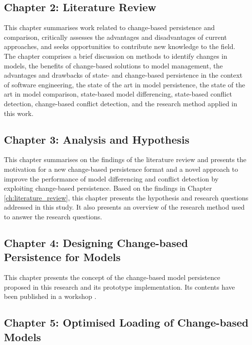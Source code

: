 \subsection{Chapter 2: Literature Review}
\label{sec:chapter_2_literature_review_plan}
This chapter summarises work related to change-based persistence and comparison, critically assesses the advantages and disadvantages of current approaches, and seeks opportunities to contribute new knowledge to the field. The chapter comprises a brief discussion on methods to identify changes in models, the benefits of change-based solutions to model management, the advantages and drawbacks of state- and change-based persistence in the context of software engineering, the state of the art in model persistence, the state of the art in model comparison, state-based model differencing, state-based conflict detection, change-based conflict detection, and the research method applied in this work.

\subsection{Chapter 3: Analysis and Hypothesis}
\label{sec:ch:analysis_and_hypothesis}
This chapter summarises on the findings of the literature review and presents the motivation for a new change-based persistence format and a novel approach to improve the performance of model differencing and conflict detection by exploiting change-based persistence. Based on the findings in Chapter \ref{ch:literature_review}, this chapter presents the hypothesis and research questions addressed in this study. It also presents an overview of the research method used to answer the research questions.

\subsection{Chapter 4: Designing Change-based Persistence for Models}
\label{sec:chapter_3_Change-based_model_ersistence_plan}
This chapter presents the concept of the change-based model persistence proposed in this research and its prototype implementation. Its contents have been published in a workshop \cite{DBLP:conf/models/YohannisKP17}.

\subsection{Chapter 5: Optimised Loading of Change-based Models}
\label{sec:chapter_4_optimised_loading_change_based_model_persistence}


